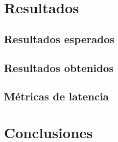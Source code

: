 \documentclass[12pt]{article}
\begin{document}
\section{Resultados}

\subsection{Resultados esperados}

\subsection{Resultados obtenidos}

\subsection{Métricas de latencia}

\section{Conclusiones}
\end{document}
